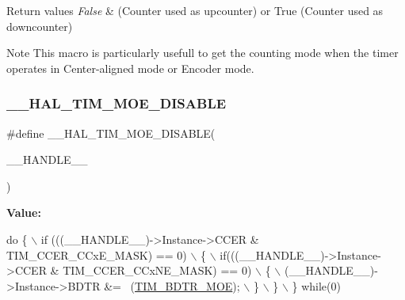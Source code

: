 \begin{DoxyRetVals}{Return values}
{\em False} & (Counter used as upcounter) or True (Counter used as downcounter) \\
\hline
\end{DoxyRetVals}
\begin{DoxyNote}{Note}
This macro is particularly usefull to get the counting mode when the timer operates in Center-\/aligned mode or Encoder mode. 
\end{DoxyNote}
\mbox{\label{group___t_i_m___exported___macros_ga69d63e147faeca8909e9679f684c0325}} 
\subsubsection{\texorpdfstring{\+\_\+\+\_\+\+H\+A\+L\+\_\+\+T\+I\+M\+\_\+\+M\+O\+E\+\_\+\+D\+I\+S\+A\+B\+LE}{\_\_HAL\_TIM\_MOE\_DISABLE}}
{\footnotesize\ttfamily \#define \+\_\+\+\_\+\+H\+A\+L\+\_\+\+T\+I\+M\+\_\+\+M\+O\+E\+\_\+\+D\+I\+S\+A\+B\+LE(\begin{DoxyParamCaption}\item[{}]{\+\_\+\+\_\+\+H\+A\+N\+D\+L\+E\+\_\+\+\_\+ }\end{DoxyParamCaption})}

{\bfseries Value\+:}
\begin{DoxyCode}
\textcolor{keywordflow}{do} \{ \(\backslash\)
                          if (((\_\_HANDLE\_\_)->Instance->CCER & TIM\_CCER\_CCxE\_MASK) == 0) \(\backslash\)
                          \{ \(\backslash\)
                            if(((\_\_HANDLE\_\_)->Instance->CCER & TIM\_CCER\_CCxNE\_MASK) == 0) \(\backslash\)
                            \{ \(\backslash\)
                              (\_\_HANDLE\_\_)->Instance->BDTR &= ~(\hyperlink{group___peripheral___registers___bits___definition_ga277a096614829feba2d0a4fbb7d3dffc}{TIM\_BDTR\_MOE}); \(\backslash\)
                            \} \(\backslash\)
                            \} \(\backslash\)
                        \} \textcolor{keywordflow}{while}(0)
\end{DoxyCode}



